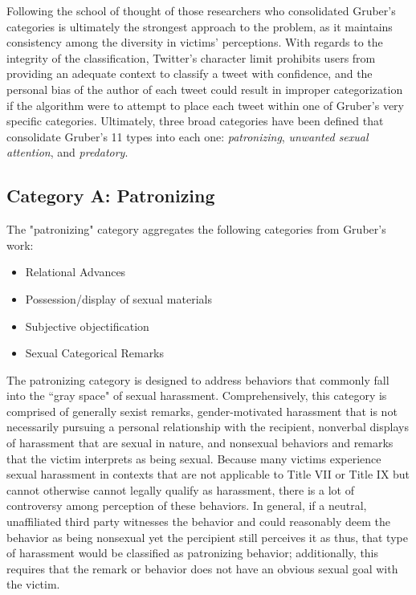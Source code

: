 Following the school of thought of those researchers who consolidated Gruber's categories is ultimately the strongest approach to the problem, as it maintains consistency among the diversity in victims' perceptions. With regards to the integrity of the classification, Twitter's character limit prohibits users from providing an adequate context to classify a tweet with confidence, and the personal bias of the author of each tweet could result in improper categorization if the algorithm were to attempt to place each tweet within one of Gruber's very specific categories. Ultimately, three broad categories have been defined that consolidate Gruber's 11 types into each one: \textit{patronizing}, \textit{unwanted sexual attention}, and \textit{predatory}.

\subsection{Category A: Patronizing}

The "patronizing" category aggregates the following categories from Gruber's work:

\begin{itemize}
  \item Relational Advances
  \item Possession/display of sexual materials
  \item Subjective objectification
  \item Sexual Categorical Remarks
\end{itemize}

The patronizing category is designed to address behaviors that commonly fall into the ``gray space" of sexual harassment. Comprehensively, this category is comprised of generally sexist remarks, gender-motivated harassment that is not necessarily pursuing a personal relationship with the recipient, nonverbal displays of harassment that are sexual in nature, and nonsexual behaviors and remarks that the victim interprets as being sexual. Because many victims experience sexual harassment in contexts that are not applicable to Title VII or Title IX but cannot otherwise cannot legally qualify as harassment, there is a lot of controversy among perception of these behaviors. In general, if a neutral, unaffiliated third party witnesses the behavior and could reasonably deem the behavior as being nonsexual yet the percipient still perceives it as thus, that type of harassment would be classified as patronizing behavior; additionally, this requires that the remark or behavior does not have an obvious sexual goal with the victim.

